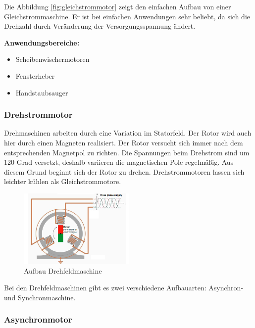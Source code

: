 Die Abbildung \ref{fig:gleichstrommotor} zeigt den einfachen Aufbau von einer Gleichstrommaschine. Er ist bei einfachen Anwendungen sehr beliebt, da sich die Drehzahl durch Veränderung der Versorgungsspannung ändert.\newline

\textbf{Anwendungsbereiche:}

\begin{itemize}
	\item{Scheibenwischermotoren}
	\item{Fensterheber}
	\item{Handstaubsauger}
\end{itemize}

\subsubsection{Drehstrommotor}
\label{sec:drehstrom}

Drehmaschinen arbeiten durch eine Variation im Statorfeld. Der Rotor wird auch hier durch einen Magneten realisiert. Der Rotor versucht sich immer nach dem entsprechenden Magnetpol zu richten. Die Spannungen beim Drehstrom sind um 120 Grad versetzt, deshalb variieren die magnetischen Pole regelmäßig. Aus diesem Grund beginnt sich der Rotor zu drehen. Drehstrommotoren lassen sich leichter kühlen als Gleichstrommotore. 

\begin{figure}[!ht]
\begin{center}
	\caption{Aufbau Drehfeldmaschine}
	\includegraphics[width=0.5\textwidth]{Drehstrommotor}
\end{center}
\end{figure}

Bei den Drehfeldmaschinen gibt es zwei verschiedene Aufbauarten: Asynchron- und Synchronmaschine.

\subsubsection{Asynchronmotor}
\label{sec:asynchronmotor}

